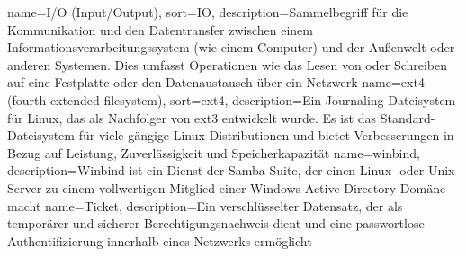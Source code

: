 {
	name={I/O (In\-put/Out\-put)},
	sort={IO},
	description={Sam\-mel\-be\-griff für die Kom\-mu\-ni\-ka\-ti\-on und den Da\-ten\-trans\-fer zwi\-schen ei\-nem In\-for\-ma\-ti\-ons\-ver\-ar\-bei\-tungs\-sys\-tem (wie ei\-nem Com\-pu\-ter) und der Au\-ßen\-welt oder an\-de\-ren Sys\-te\-men. Dies um\-fasst Ope\-ra\-tio\-nen wie das Le\-sen von oder Schrei\-ben auf eine Fest\-plat\-te oder den Da\-ten\-aus\-tausch über ein Netz\-werk}
}
{
	name={ext4 (fourth ex\-ten\-ded file\-sys\-tem)},
	sort={ext4},
	description={Ein Jour\-na\-ling-Da\-tei\-sys\-tem für Li\-nux, das als Nach\-fol\-ger von ext3 ent\-wi\-ckelt wur\-de. Es ist das Stan\-dard-Da\-tei\-sys\-tem für vie\-le gän\-gi\-ge Li\-nux-Dis\-tri\-bu\-tio\-nen und bie\-tet Ver\-bes\-se\-run\-gen in Be\-zug auf Leis\-tung, Zu\-ver\-läs\-sig\-keit und Spei\-cher\-ka\-pa\-zi\-tät}
}
{
	name={win\-bind},
	description={Win\-bind ist ein Dienst der Sam\-ba-Sui\-te, der ei\-nen Li\-nux- oder Unix-Ser\-ver zu ei\-nem voll\-wer\-ti\-gen Mit\-glied ei\-ner Win\-dows Ac\-tive Di\-rec\-to\-ry-Do\-mä\-ne macht}
}
{
	name={Ti\-cket},
	description={Ein ver\-schlüs\-sel\-ter Da\-ten\-satz, der als tem\-po\-rä\-rer und si\-che\-rer Be\-rech\-ti\-gungs\-nach\-weis dient und eine pass\-wort\-lo\-se Au\-then\-ti\-fi\-zie\-rung in\-ner\-halb ei\-nes Netz\-werks er\-mög\-licht}
}
